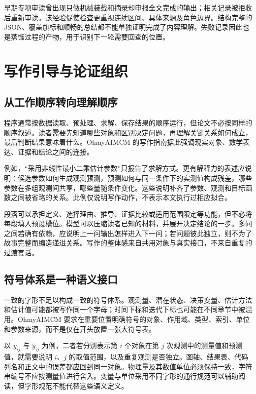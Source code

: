 \documentclass[UTF8,a4paper,zihao=-4,fontset=fandol]{ctexart}
\newcommand{\sys}{\textsf{OhmyAIMCM}}
\begin{document}
早期专项审读曾出现只做机械装载和摘录却申报全文完成的输出；相关记录被拒收后重新审读。该经验促使检查更重视连续区间、具体来源及角色边界。结构完整的 JSON、覆盖旗标和顺畅的总结都不能单独证明完成了内容理解。失败记录因此也是蒸馏过程的产物，用于识别下一轮需要回查的位置。

\section{写作引导与论证组织}

\subsection{从工作顺序转向理解顺序}

程序通常按数据读取、预处理、求解、保存结果的顺序运行，但论文不必按同样的顺序叙述。读者需要先知道哪些对象和区别决定问题，再理解关键关系如何成立，最后判断结果意味着什么。\sys{} 的写作指南据此强调现实对象、数学表达、证据和结论之间的连接\cite{writing}。

例如，“采用非线性最小二乘估计参数”只报告了求解方式。更有解释力的表述应说明：候选参数如何生成观测预测，预测如何与同一条件下的实测值构成残差，哪些参数在多组观测间共享，哪些量随条件变化。这些说明补齐了参数、观测和目标函数之间被省略的关系。此例仅说明写作动作，不表示本文执行过相应拟合。

段落可以承担定义、选择理由、推导、证据比较或适用范围限定等功能，但不必将每段填入预设槽位。模型可以压缩读者已知的材料，并展开决定结论的一步。多问之间若确有依赖，应说明上一问输出怎样进入下一问；若问题彼此独立，则不为了故事完整而编造递进关系。写作的整体感来自共用对象与真实接口，不来自重复的过渡套话。

\subsection{符号体系是一种语义接口}

一致的字形不足以构成一致的符号体系。观测量、潜在状态、决策变量、估计方法和估计值可能都被写作同一个字母；时间下标和迭代下标也可能在不同章节中被混用。\sys{} 要求在重要位置明确符号的对象、作用域、类型、索引、单位和参数来源，而不是仅在开头放置一张大符号表。

以 $y_{ij}$ 与 $\widehat y_{ij}$ 为例，二者若分别表示第 $i$ 个对象在第 $j$ 次观测中的测量值和预测值，就需要说明 $i$、$j$ 的取值范围，以及重复观测是否独立。图轴、结果表、代码列名和正文中的误差都应回到同一对象。物理量及其数值单位必须保持一致，字符串编号不应按测量值进行舍入。变量与单位采用不同字形的通行规范可以辅助阅读\cite{nist}，但字形规范不能代替这些语义定义。
\end{document}
